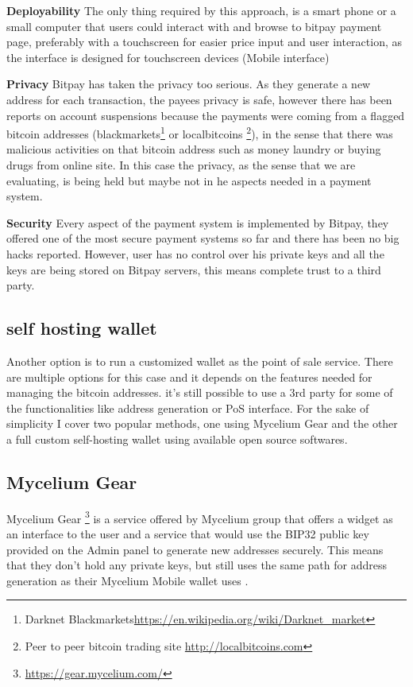  \textbf{Deployability}
The only thing required by this approach, is a smart phone or a small computer that users could interact with and browse to bitpay payment page, preferably with a touchscreen for easier price input and user interaction, as the interface is designed for touchscreen devices (Mobile interface)

 \textbf{Privacy}
Bitpay has taken the privacy too serious. As they generate a new address for each transaction, the payees privacy is safe, however there has been reports on account suspensions because the payments were coming from a flagged bitcoin addresses (\eg blackmarkets\footnote{Darknet Blackmarkets\url{https://en.wikipedia.org/wiki/Darknet_market}} or localbitcoins \footnote{Peer to peer bitcoin trading site \url{http://localbitcoins.com}}), in the sense that there was malicious activities on that bitcoin address such as money laundry or buying drugs from online site. In this case the privacy, as the sense that we are evaluating, is being held but maybe not in he aspects needed in a payment system.

 \textbf{Security}
Every aspect of the payment system is implemented by Bitpay, they offered one of the most secure payment systems so far and there has been no big hacks reported. However, user has no control over his private keys and all the keys are being stored on Bitpay servers, this means complete trust to a third party.


\subsection{self hosting wallet}
Another option is to run a customized wallet as the point of sale service. There are multiple options for this case and it depends on the features needed for managing the bitcoin addresses. it's still possible to use a 3rd party for some of the functionalities like address generation or PoS interface. For the sake of simplicity I cover two popular methods, one using Mycelium Gear and the other a full custom self-hosting wallet using available open source softwares.


\subsection{Mycelium Gear}
Mycelium Gear \footnote{\url{https://gear.mycelium.com/}} is a service offered by Mycelium group that offers a widget as an interface to the user and a service that would use the BIP32 public key provided on the Admin panel to generate new addresses securely. This means that they don't hold any private keys, but still uses the same path for address generation as their Mycelium Mobile wallet uses .

